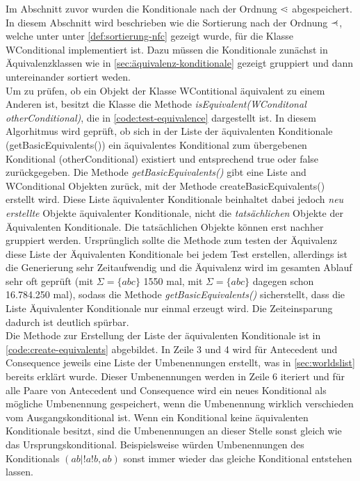 \documentclass[12pt,a4paper]{article}
\newcommand\dotl{\mathrel{%
    \mathchoice{\QEQ}{\QEQ}{\QEQ}{\QEQ}%
}}
\def\QEQ{{%
    \setbox0\hbox{<}%
    \rlap{\hbox to \wd0{\hss \raisebox {0.1pt}{$\ \cdot$\hss}}}\box0
}}
\newcommand\rdotl{\mathrel{%
    \mathchoice{\RQEQ}{\RQEQ}{\RQEQ}{\RQEQ}%
}}
\def\RQEQ{{%
    \setbox0\hbox{$\prec$}%
    \rlap{\hbox to \wd0{\hss \raisebox {0.01pt}{$\ \cdot$\hss}}}\box0
}}
\begin{document}
Im Abschnitt zuvor wurden die Konditionale nach der Ordnung $\dotl$ abgespeichert. In diesem Abschnitt wird beschrieben wie die Sortierung nach der Ordnung $\rdotl$, welche unter unter \autoref{def:sortierung-nfc} gezeigt wurde, für die Klasse WConditional implementiert ist. Dazu müssen die Konditionale zunächst in Äquivalenzklassen wie in \autoref{sec:äquivalenz-konditionale} gezeigt gruppiert und dann untereinander sortiert weden. \\
Um zu prüfen, ob ein Objekt der Klasse WContitional äquivalent zu einem Anderen ist, besitzt die Klasse die Methode \textit{isEquivalent(WConditonal otherConditional)}, die in \autoref{code:test-equivalence} dargestellt ist. In diesem Algorhitmus wird geprüft, ob sich in der Liste der äquivalenten Konditionale (getBasicEquivalents()) ein äquivalentes Konditional zum übergebenen Konditional (otherConditional) existiert und entsprechend true oder false zurückgegeben. Die Methode \textit{getBasicEquivalents()} gibt eine Liste and WConditional Objekten zurück, mit der Methode createBasicEquivalents() erstellt wird. Diese Liste äquivalenter Konditionale beinhaltet dabei jedoch \textit{neu erstellte} Objekte äquivalenter Konditionale, nicht die \textit{tatsächlichen} Objekte der Äquivalenten Konditionale. Die tatsächlichen Objekte können erst nachher gruppiert werden. Ursprünglich sollte die Methode zum testen der Äquivalenz diese Liste der Äquivalenten Konditionale bei jedem Test erstellen, allerdings ist die Generierung sehr Zeitaufwendig und die Äquivalenz wird im gesamten Ablauf sehr oft geprüft (mit $\Sigma=\{abc \}$ 1550 mal, mit $\Sigma=\{abc\}$ dagegen schon 16.784.250 mal), sodass die Methode \textit{getBasicEquivalents()} sicherstellt, dass die Liste Äquivalenter Konditionale nur einmal erzeugt wird. Die Zeiteinsparung dadurch ist deutlich spürbar.\\ 
Die Methode zur Erstellung der Liste der äquivalenten Konditionale ist in \autoref{code:create-equivalents} abgebildet. In Zeile 3 und 4 wird für Antecedent und Consequence jeweils eine Liste der Umbenennungen erstellt, was in \autoref{sec:worldslist} bereits erklärt wurde. Dieser Umbenennungen werden in Zeile 6 iteriert und für alle Paare von Antecedent und Consequence wird ein neues Konditional als mögliche Umbenennung gespeichert, wenn die Umbenennung wirklich verschieden vom Ausgangskonditional ist. Wenn ein Konditional keine äquivalenten Konditionale besitzt, sind die Umbenennungen an dieser Stelle sonst gleich wie das Ursprungskonditional. Beispielsweise würden Umbenennungen des Konditionals $(ab|!a!b,ab)$ sonst immer wieder das gleiche Konditional entstehen lassen. \\
\end{document}
